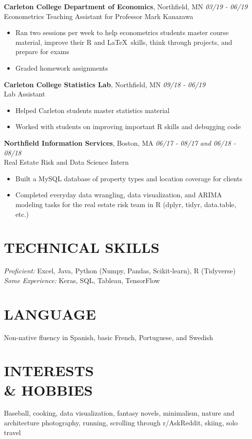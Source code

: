 \documentclass[margin, 10pt]{res} %
\begin{document}
\begin{resume}
{\sl} \textbf{Carleton College Department of Economics}, Northfield, MN \hfill \textit{03/19 - 06/19}\\
{\sl} Econometrics Teaching Assistant for Professor Mark Kanazawa\smallskip
{\sl} \begin{itemize}
	\item Ran two sessions per week to help econometrics students master course material, improve their R and \LaTeX \ skills, think through projects, and prepare for exams
	\item Graded homework assignments
\end{itemize}


{\sl} \textbf{Carleton College Statistics Lab}, Northfield, MN \hfill \textit{09/18 - 06/19}\\
{\sl} Lab Assistant \smallskip
{\sl} \begin{itemize}
\item Helped Carleton students master statistics material
\item Worked with students on improving important R skills and debugging code
\end{itemize}

{\sl} \textbf{Northfield Information Services}, Boston, MA \hfill \textit{06/17 - 08/17 and 06/18 - 08/18}\\
{\sl} Real Estate Risk and Data Science Intern \smallskip
{\sl} \begin{itemize}
\item Built a MySQL database of property types and location coverage for clients
\item Completed everyday data wrangling, data visualization, and ARIMA modeling tasks for the real estate risk team in R (dplyr, tidyr, data.table, etc.)
\end{itemize}


\section{TECHNICAL SKILLS}
{\sl Proficient:} Excel, Java, Python (Numpy, Pandas, Scikit-learn), R (Tidyverse)\\ \smallskip
{\sl Some Experience:} Keras, SQL, Tableau, TensorFlow

\section{LANGUAGE}
{\sl} Non-native fluency in Spanish, basic French, Portuguese, and Swedish

\section{INTERESTS \\\& HOBBIES}
{\sl} Baseball, cooking, data visualization, fantasy novels, minimalism, nature and architecture photography, running, scrolling through r/AskReddit, skiing, solo travel

\end{resume}
\end{document}
